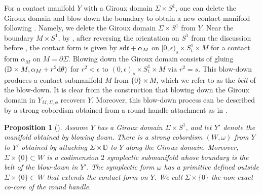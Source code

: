\documentclass[11pt]{amsart}
\numberwithin{equation}{section}
\newtheorem{proposition}[theorem]{\textbf{Proposition}}
\def\D{{\mathbb D}}
\def\rd{{\rm d}}
\begin{document}
For a contact manifold $Y$ with a Giroux domain $\Sigma \times S^1$, one can delete the Giroux domain and blow down the boundary to obtain a new contact manifold following \cite[\S 4.1]{MNW}. Namely, we delete the Giroux domain $\Sigma \times S^1$ from $Y$. Near the boundary $M\times S^1$, by \cite[Lemma 4.1]{MNW}, after reversing the orientation on $S^1$ from the discussion before , the contact form is given by $s\rd t+\alpha_M$ on $[0,\epsilon)_s\times S^1_t\times M$ for a contact form $\alpha_M$ on $M=\partial \Sigma$. Blowing down the Giroux domain consists of gluing $(\D \times M, \alpha_M+r^2\rd \theta)$ for $r^2<\epsilon$ to $(0,\epsilon)_s\times S^1_t\times M$ via $r^2=s$. This blow-down produces a contact submanifold $M$ from $\{0\}\times M$, which we refer to as the \emph{belt} of the blow-down. It is clear from the construction that blowing down the Giroux domain in $Y_{M,\Sigma,\phi}$ recovers $Y$. Moreover, this blow-down process can be described by a strong cobordism obtained from a round handle attachment as in \cite[\S 5.1]{MNW}.

\begin{proposition}[{\cite[Theorem 5.1]{MNW}}]\label{prop:cap}
Assume $Y$ has a Giroux domain $\Sigma\times S^1$, and let $Y'$ denote the manifold obtained by blowing down. There is a strong cobordism $(W,\omega)$ from $Y$ to $Y'$ obtained by attaching $\Sigma \times \D$ to $Y$ along the Giroux domain. Moreover, $\Sigma\times \{0\}\subset W$ is a codimension $2$ symplectic submanifold whose boundary is the belt of the blow-down in $Y'$. The symplectic form $\omega$ has a primitive defined outside $\Sigma\times \{0\}\subset W$ that extends the contact form on $Y$. We call $\Sigma \times \{0\}$ the non-exact co-core of the round handle.
\end{proposition}
\end{document}
